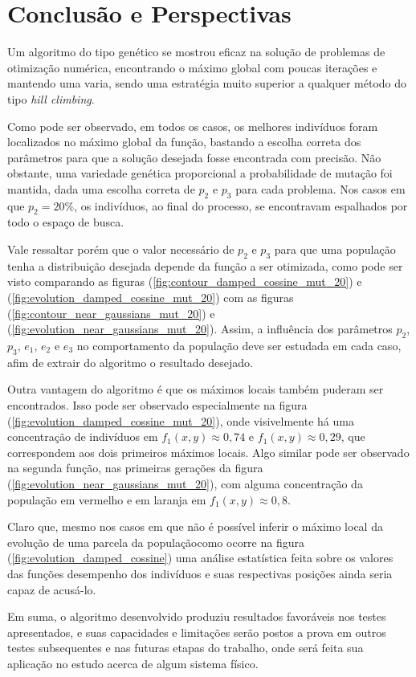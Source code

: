 \chapter{Conclusão e Perspectivas}\label{cap_conclusao}

Um algoritmo do tipo genético se mostrou eficaz na solução de problemas de otimização
numérica, encontrando o máximo global com poucas iterações e mantendo uma varia, sendo uma
estratégia muito superior a qualquer método do tipo \textit{hill climbing}. 

Como pode ser observado, em todos os casos, os melhores indivíduos foram localizados no máximo global
da função, bastando a escolha correta dos parâmetros para que a solução desejada
fosse encontrada com precisão. Não obstante, uma variedade genética proporcional a
probabilidade de mutação foi mantida, dada uma escolha correta de $p_2$ e $p_3$ para cada
problema. Nos casos em que $p_2 = 20\%$, os indivíduos, ao final do processo, se encontravam
espalhados por todo o espaço de busca. 

Vale ressaltar porém que o valor necessário de $p_2$ e $p_3$ para que uma população 
tenha a distribuição desejada depende da função a ser otimizada, como pode ser visto
comparando as figuras (\ref{fig:contour_damped_cossine_mut_20}) e (\ref{fig:evolution_damped_cossine_mut_20})
com as figuras (\ref{fig:contour_near_gaussians_mut_20}) e (\ref{fig:evolution_near_gaussians_mut_20}).
Assim, a influência dos parâmetros $p_2$, $p_3$, $e_1$, $e_2$ e $e_3$ no comportamento da população
deve ser estudada em cada caso, afim de extrair do algoritmo o resultado desejado.

Outra vantagem do algoritmo é que os máximos locais também puderam ser encontrados.
Isso pode ser observado especialmente na figura (\ref{fig:evolution_damped_cossine_mut_20}),
onde visivelmente há uma concentração de indivíduos em $ f_1(x,y) \approx 0,74 $ e 
$ f_1(x,y) \approx 0,29 $, que correspondem aos dois primeiros máximos locais.
Algo similar pode ser observado na segunda função, nas primeiras gerações da figura 
(\ref{fig:evolution_near_gaussians_mut_20}), com alguma concentração da população em
vermelho e em laranja em $f_1(x,y) \approx 0,8$.

Claro que, mesmo nos casos em que não é possível inferir o máximo local da evolução
de uma parcela da população\trav como ocorre na figura (\ref{fig:evolution_damped_cossine})\trav
uma análise estatística feita sobre os valores das funções desempenho dos indivíduos e
suas respectivas posições ainda seria capaz de acusá-lo.

Em suma, o algoritmo desenvolvido produziu resultados favoráveis nos testes apresentados, e suas capacidades
e limitações serão postos a prova em outros testes subsequentes e nas futuras etapas do trabalho, 
onde será feita sua aplicação no estudo acerca de algum sistema físico.

\nocite{charbonneau2002ga}